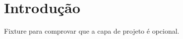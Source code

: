 \documentclass{abntexto-ufc}
\begin{document}
\pretextual

\imprimircapa
\imprimirfolhaderosto
\imprimirsumario

\textual
\section{Introdução}
Fixture para comprovar que a capa de projeto é opcional.
\end{document}
